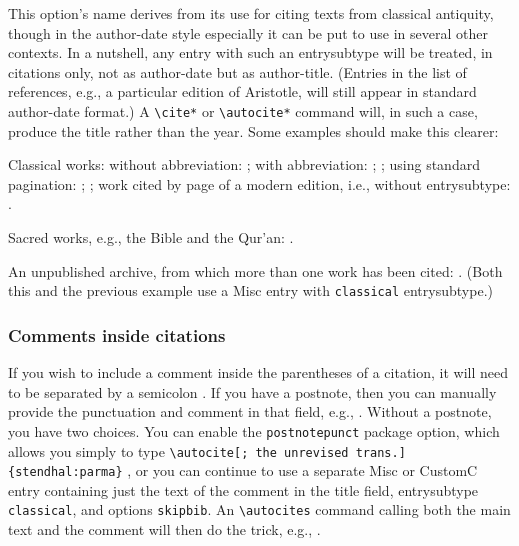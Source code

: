 \documentclass[a4paper,12pt]{report}
\newcommand{\cmd}[1]{\texttt{\textbackslash #1}}
\begin{document}
This option's name derives from its use for citing texts from
classical antiquity, though in the author-date style especially it can
be put to use in several other contexts.  In a nutshell, any entry
with such an \textsf{entrysubtype} will be treated, in citations only,
not as author-date but as author-title.  (Entries in the list of
references, e.g., a particular edition of Aristotle, will still appear
in standard author-date format.)  A \cmd{cite*} or \cmd{autocite*}
command will, in such a case, produce the title rather than the year.
Some examples should make this clearer:


Classical works: without abbreviation:
\autocite{aristotle:metaphy:trans}; with abbreviation:
\autocite{aristotle:metaphy:gr}; \autocite{plato:republic:gr}; using
standard pagination: \autocite*[3.2.996b5--8]{aristotle:metaphy:gr};
\autocite*[420e]{plato:republic:gr}; work cited by page of a modern
edition, i.e., without \textsf{entrysubtype}:
\autocite[198]{euripides:orestes}.

Sacred works, e.g., the Bible and the Qur'an:
\autocite[25:19--36:43]{genesis}.

An unpublished archive, from which more than one work has been cited:
\autocite[file 12]{house:papers}.  (Both this and the previous example
use a Misc entry with \texttt{classical} \textsf{entrysubtype}.)

\subsubsection*{Comments inside citations}
\label{sec:comments}

If you wish to include a comment inside the parentheses of a citation,
it will need to be separated by a semicolon
\autocite[15.23]{chicago:manual}.  If you have a \textsf{postnote},
then you can manually provide the punctuation and comment in that
field, e.g., \autocite[4; the unrevised trans.]{stendhal:parma}.
Without a \textsf{postnote}, you have two choices.  You can enable the
\texttt{postnotepunct} package option, which allows you simply to type
\cmd{autocite[; the unrevised trans.]\{stendhal:parma\}}
\citereset\autocite[; the unrevised trans.]{stendhal:parma}, or you
can continue to use a separate \textsf{Misc} or \textsf{CustomC} entry
containing just the text of the comment in the \textsf{title} field,
\textsf{entrysubtype} \texttt{classical}, and \textsf{options}
\texttt{skipbib}.  An \cmd{autocites} command calling both the main
text and the comment will then do the trick, e.g.,
\autocites{chicago:manual}{chicago:comment}.
\end{document}
